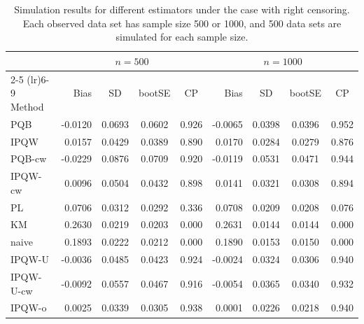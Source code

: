 \begin{table}[ht]
\centering
\caption{Simulation results for different estimators under the case with right censoring. Each observed data set has sample size 500 or 1000, and 500 data sets are simulated for each sample size.}
\label{tab:simu2_cens}
\begin{tabular}{lrcccrccc}
  \toprule
  & \multicolumn{4}{c}{$n = 500$} & \multicolumn{4}{c}{$n = 1000$} \\
  \cmidrule(lr){2-5} \cmidrule(lr){6-9}
  Method & Bias & SD & bootSE & CP & Bias & SD & bootSE & CP \\
  \midrule
  PQB & -0.0120 & 0.0693 & 0.0602 & 0.926 & -0.0065 & 0.0398 & 0.0396 & 0.952 \\
  IPQW & 0.0157 & 0.0429 & 0.0389 & 0.890 & 0.0170 & 0.0284 & 0.0279 & 0.876 \\
  PQB-cw & -0.0229 & 0.0876 & 0.0709 & 0.920 & -0.0119 & 0.0531 & 0.0471 & 0.944 \\
  IPQW-cw & 0.0096 & 0.0504 & 0.0432 & 0.898 & 0.0141 & 0.0321 & 0.0308 & 0.894 \\
  PL & 0.0706 & 0.0312 & 0.0292 & 0.336 & 0.0708 & 0.0209 & 0.0208 & 0.076 \\
  KM & 0.2630 & 0.0219 & 0.0203 & 0.000 & 0.2631 & 0.0144 & 0.0144 & 0.000 \\
  naive & 0.1893 & 0.0222 & 0.0212 & 0.000 & 0.1890 & 0.0153 & 0.0150 & 0.000 \\
  \midrule
  IPQW-U & -0.0036 & 0.0485 & 0.0423 & 0.924 & -0.0024 & 0.0324 & 0.0306 & 0.940 \\
  IPQW-U-cw & -0.0092 & 0.0557 & 0.0467 & 0.916 & -0.0054 & 0.0365 & 0.0340 & 0.932 \\
  IPQW-o & 0.0025 & 0.0339 & 0.0305 & 0.938 & 0.0001 & 0.0226 & 0.0218 & 0.940 \\
  \bottomrule
\end{tabular}
\end{table}
